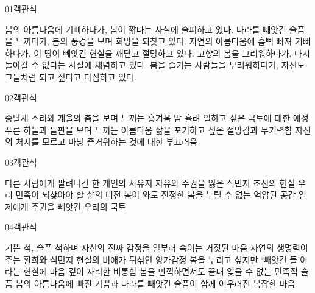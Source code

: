 \documentclass[fs85,seriesRus]{korfarm-base}
\begin{document}
\par\medskip
\kfBeginMC
\begin{kfQBlock}{01}{객관식}
\begin{kfChoices}
\kfChoice 봄의 아름다움에 기뻐하다가, 봄이 짧다는 사실에 슬퍼하고 있다.
\kfChoice 나라를 빼앗긴 슬픔을 느끼다가, 봄의 풍경을 보며 희망을 되찾고 있다.
\kfChoice 자연의 아름다움에 흠뻑 빠져 기뻐하다가, 이 땅이 빼앗긴 현실을 깨닫고 절망하고 있다.
\kfChoice 고향의 봄을 그리워하다가, 다시 돌아갈 수 없다는 사실에 체념하고 있다.
\kfChoice 봄을 즐기는 사람들을 부러워하다가, 자신도 그들처럼 되고 싶다고 다짐하고 있다.
\end{kfChoices}
\end{kfQBlock}
\begin{kfQBlock}{02}{객관식}
\begin{kfChoices}
\kfChoice 종달새 소리와 개울의 춤을 보며 느끼는 흥겨움
\kfChoice 땀 흘려 일하고 싶은 국토에 대한 애정
\kfChoice 푸른 하늘과 들판을 보며 느끼는 아름다움
\kfChoice 삶을 포기하고 싶은 절망감과 무기력함
\kfChoice 자신의 처지를 모르고 마냥 즐거워하는 것에 대한 부끄러움
\end{kfChoices}
\end{kfQBlock}
\begin{kfQBlock}{03}{객관식}
\begin{kfChoices}
\kfChoice 다른 사람에게 팔려나간 한 개인의 사유지
\kfChoice 자유와 주권을 잃은 식민지 조선의 현실
\kfChoice 우리 민족이 되찾아야 할 삶의 터전
\kfChoice 봄이 와도 진정한 봄을 누릴 수 없는 억압된 공간
\kfChoice 일제에게 주권을 빼앗긴 우리의 국토
\end{kfChoices}
\end{kfQBlock}
\begin{kfQBlock}{04}{객관식}
\begin{kfChoices}
\kfChoice 기쁜 척, 슬픈 척하며 자신의 진짜 감정을 일부러 속이는 거짓된 마음
\kfChoice 자연의 생명력이 주는 환희와 식민지 현실의 비애가 뒤섞인 양가감정
\kfChoice 봄을 누리고 싶지만 ‘빼앗긴 들’이라는 현실에 마음 깊이 자리한 비통함
\kfChoice 봄을 만끽하면서도 끝내 잊을 수 없는 민족적 슬픔
\kfChoice 봄의 아름다움에 빠진 기쁨과 나라를 빼앗긴 슬픔이 함께 어우러진 복잡한 마음
\end{kfChoices}
\end{kfQBlock}
\end{document}
